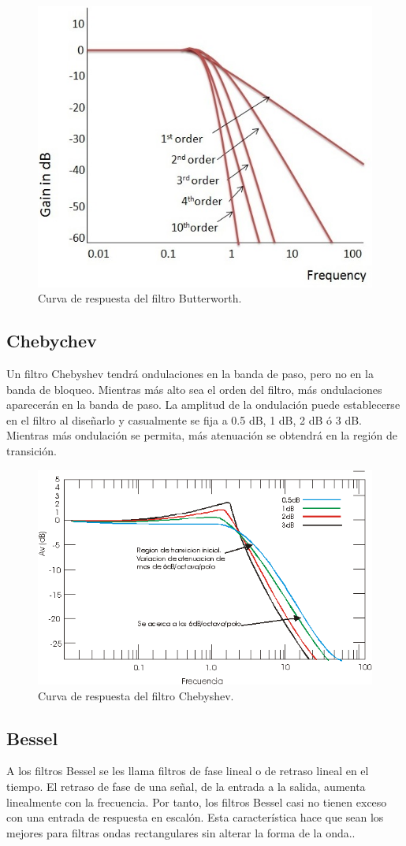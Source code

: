 \begin{figure}[H]
    \centering
    \includegraphics[width=0.5\linewidth]{Imagenes/Filtros Butterworth.png}
    \caption{Curva de respuesta del filtro Butterworth.}
    \label{fig:Butterworth}
\end{figure}

\subsection{Chebychev}
Un filtro Chebyshev tendrá ondulaciones en la banda de paso, pero no en la banda de bloqueo. Mientras más alto sea el orden del filtro, más ondulaciones aparecerán en la banda de paso. La amplitud de la ondulación puede establecerse en el filtro al diseñarlo y casualmente se fija a 0.5 dB, 1 dB, 2 dB ó 3 dB. Mientras más ondulación se permita, más atenuación se obtendrá en la región de transición.

\begin{figure}[H]
    \centering
    \includegraphics[width=0.5\linewidth]{Imagenes/Filtros Chebyshev.png}
    \caption{Curva de respuesta del filtro Chebyshev.}
    \label{fig:Chebyshev}
\end{figure}

\subsection{Bessel}
A los filtros Bessel se les llama filtros de fase lineal o de retraso lineal en el tiempo. El retraso de fase de una señal, de la entrada a la salida, aumenta linealmente con la frecuencia. Por tanto, los filtros Bessel casi no tienen exceso con una entrada de respuesta en escalón. Esta característica hace que sean los mejores para filtras ondas rectangulares sin alterar la forma de la onda.. 

